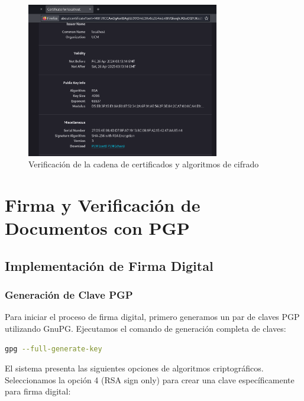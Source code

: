 \documentclass[12pt,a4paper]{article}
\begin{document}
\begin{figure}[H]
  \centering
  \includegraphics[width=0.75\textwidth]{./assets/img6.png}
  \caption{Verificación de la cadena de certificados y algoritmos de cifrado}
  \label{fig:cert-chain}
\end{figure}

\section{Firma y Verificación de Documentos con PGP}

\subsection{Implementación de Firma Digital}

\subsubsection{Generación de Clave PGP}

Para iniciar el proceso de firma digital, primero generamos un par de claves
PGP utilizando GnuPG. Ejecutamos el comando de generación completa de claves:

\begin{lstlisting}[language=bash, caption=Generación de clave PGP con GnuPG]
gpg --full-generate-key
\end{lstlisting}

El sistema presenta las siguientes opciones de algoritmos criptográficos.
Seleccionamos la opción 4 (RSA sign only) para crear una clave específicamente
para firma digital:
\end{document}
